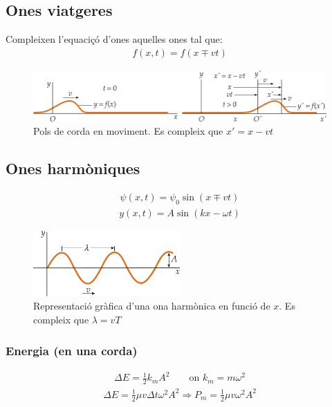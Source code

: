 \subsection{Ones viatgeres}
Compleixen l'equaciçó d'ones aquelles ones tal que:
\begin{align}
    \boxed{f(x,t) = f(x \mp v t)}
\end{align}
\begin{figure}[H]
\centering
    \includegraphics[width=\textwidth]{images/2/23-viatgeres.png}
\caption{Pols de corda en moviment. Es compleix que $x' = x - vt$}
\end{figure}

\subsection{Ones harmòniques}
\begin{align}
    \boxed{\psi (x,t) = \psi_{0} \sin (x \mp v t)}
\end{align}
\begin{align}
    \boxed{y (x,t) = A \sin (kx - \omega t)}
\end{align}
\begin{figure}[H]
\centering
   \includegraphics[width=0.5\textwidth]{images/2/24-harmonica.png}
\caption{Representació gràfica d'una ona harmònica en funció de $x$. Es compleix que $\lambda = v T$}
\end{figure}

\subsubsection*{Energia (en una corda)}
\begin{align}
    \boxed{\Delta E = \frac{1}{2} k_{m} A^{2}} \qquad \text{on } k_{m} = m \omega^{2}
\end{align}
\begin{align}
    \Delta E = \frac{1}{2} \mu v \Delta t \omega^{2} A^{2} \Rightarrow \boxed{P_{m} = \frac{1}{2} \mu v \omega^{2} A^{2}}
\end{align}
